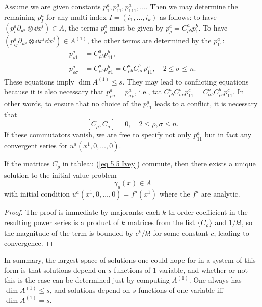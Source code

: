 \begin{example}
Assume we are given constants $p_1^a,p_{11}^a,p^a_{111},\ldots $. Then we may determine the remaining $p^a_I$ for any multi-index $I=(i_1,\ldots,i_k)$ as follows: to have $(p^a_i \partial_{u^a}\otimes \dd x^i)\in A$, the terms $p^a_\rho$ must be given by $p^a_\rho=C^a_{\rho b}p^b_1$. To have $(p^a_{ij}\partial_{u^a}\otimes \dd x^i\dd x^j)\in A^{(1)}$, the other terms are determined by the $p^a_{11}$:
\begin{align}
    p^a_{\rho 1}&=C^a_{\rho b}p^b_{11},\\
    p^a_{\rho\sigma}&=C^a_{\rho b}p^b_{\sigma 1}=C^a_{\rho b}C^b_{\sigma c}p^c_{11},\quad 2\leq \sigma\leq n.
\end{align}
These equations imply $\dim A^{(1)}\leq s$. They may lead to conflicting equations because it is also necessary that $p^a_{\rho\sigma}=p^a_{\sigma\rho}$, i.e., tat $C^a_{\rho b}C^b_{\sigma c}p^c_{11}=C^a_{\sigma b}C^b_{\rho c}p^c_{11}$. In other words, to ensure that no choice of the $p^a_{11}$ leads to a conflict, it is necessary that 
\[[C_\rho,C_\sigma]=0,\quad 2\leq \rho,\sigma\leq n.\]
If these commutators vanish, we are free to specify not only $p^a_{11}$ but in fact any convergent series for $u^a(x^1,0,\ldots,0)$.
\begin{prop}
    If the matrices $C_\rho$ in tableau (\ref{eq 5.5 Ivey}) commute, then there exists a unique solution to the initial value problem 
    \[\gamma_u(x)\in A\]
    with initial condition $u^a(x^1,0,\ldots,0)=f^a(x^1)$ where the $f^a$ are analytic.
\end{prop}
\begin{proof}
    The proof is immediate by majorants: each $k$-th order coefficient in the resulting power series is a product of $k$ matrices from the list $\{C_\rho\}$ and $1/k!$, so the magnitude of the term is bounded by $c^k/k!$ for some constant $c$, leading to convergence.
\end{proof}

In summary, the largest space of solutions one could hope for in a system of this form is that solutions depend on $s$ functions of $1$ variable, and whether or not this is the case can be determined just by computing $A^{(1)}$. One always has $\dim A^{(1)}\leq s$, and solutions depend on $s$ functions of one variable iff $\dim A^{(1)}=s$.
\end{example}

